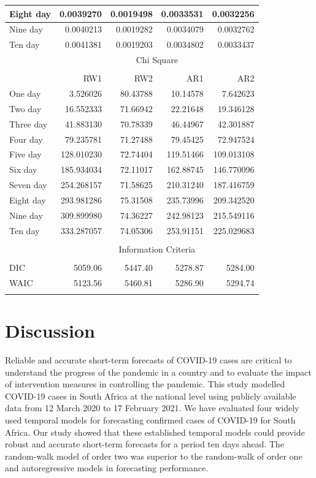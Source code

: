 \documentclass[10pt,letterpaper]{article}
\begin{document}
\begin{table}[!h]
{\begin{tabular}[t]{lrrrr}
		\hline
		Eight day & 0.0039270 & 0.0019498 & 0.0033531 & 0.0032256\\
		\hline
		Nine day & 0.0040213 & 0.0019282 & 0.0034079 & 0.0032762\\
		\hline
		Ten day & 0.0041381 & 0.0019203 & 0.0034802 & 0.0033437\\
		\hline
		& \multicolumn{4}{c}{Chi Square}\\
		\cline{2-5}\\
		& RW1 & RW2 & AR1 & AR2\\
		\hline
		One day & 3.526026 & 80.43788 & 10.14578 & 7.642623\\
		\hline
		Two day & 16.552333 & 71.66942 & 22.21648 & 19.346128\\
		\hline
		Three day & 41.883130 & 70.78339 & 46.44967 & 42.301887\\
		\hline
		Four day & 79.235781 & 71.27488 & 79.45425 & 72.947524\\
		\hline
		Five day & 128.010230 & 72.74404 & 119.51466 & 109.013108\\
		\hline
		Six day & 185.934034 & 72.11017 & 162.88745 & 146.770096\\
		\hline
		Seven day & 254.268157 & 71.58625 & 210.31240 & 187.416759\\
		\hline
		Eight day & 293.981286 & 75.31508 & 235.73996 & 209.342520\\
		\hline
		Nine day & 309.899980 & 74.36227 & 242.98123 & 215.549116\\
		\hline
		Ten day & 333.287057 & 74.05306 & 253.91151 & 225.029683\\
		\hline
		\hline\\
		& \multicolumn{4}{c}{Information Criteria}\\
		\hline\\
		DIC & 5059.06 & 5447.40 & 5278.87 & 5284.00\\
		WAIC & 5123.56 & 5460.81 & 5286.90 & 5294.74\\
		\hline\\
	\end{tabular}}
\end{table}


\newpage
\hypertarget{results}{%
\section{Discussion}\label{Discussion}}

Reliable and accurate short-term forecasts of COVID-19 cases are critical to understand the progress of the pandemic in a country and to evaluate the impact of intervention measures in controlling the pandemic. This study modelled COVID-19 cases in South Africa at the national level using publicly available data from 12 March 2020 to 17 February 2021. We have evaluated four widely used temporal models for forecasting confirmed cases of COVID-19 for South Africa. Our study showed that these established temporal models could provide robust and accurate short-term forecasts for a period ten days ahead. The random-walk model of order two was superior to the random-walk of order one and autoregressive models in forecasting performance.  
\end{document}
